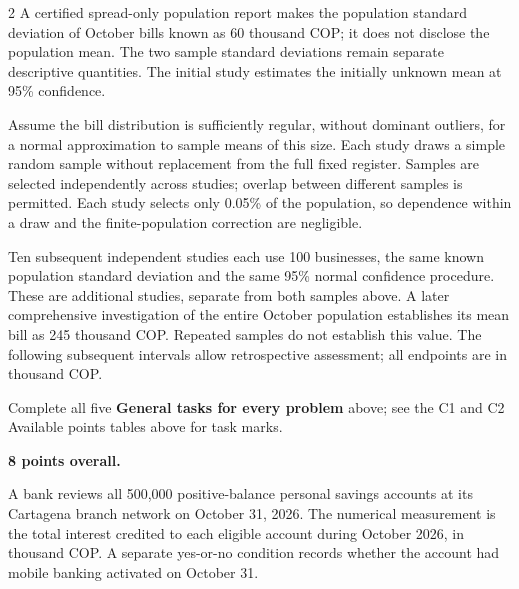 \begin{multicols}{2}
A certified spread-only population report makes the population standard deviation of October bills known as 60 thousand COP; it does not disclose the population mean. The two sample standard deviations remain separate descriptive quantities. The initial study estimates the initially unknown mean at 95\% confidence.

Assume the bill distribution is sufficiently regular, without dominant outliers, for a normal approximation to sample means of this size. Each study draws a simple random sample without replacement from the full fixed register. Samples are selected independently across studies; overlap between different samples is permitted. Each study selects only 0.05\% of the population, so dependence within a draw and the finite-population correction are negligible.

Ten subsequent independent studies each use 100 businesses, the same known population standard deviation and the same 95\% normal confidence procedure. These are additional studies, separate from both samples above. A later comprehensive investigation of the entire October population establishes its mean bill as 245 thousand COP. Repeated samples do not establish this value. The following subsequent intervals allow retrospective assessment; all endpoints are in thousand COP.


\par\smallskip
Complete all five \textbf{General tasks for every problem} above; see the C1 and C2 Available points tables above for task marks.

\endgroup

\textbf{8 points overall.}

A bank reviews all 500,000 positive-balance personal savings accounts at its Cartagena branch network on October 31, 2026. The numerical measurement is the total interest credited to each eligible account during October 2026, in thousand COP. A separate yes-or-no condition records whether the account had mobile banking activated on October 31.


\end{multicols}
